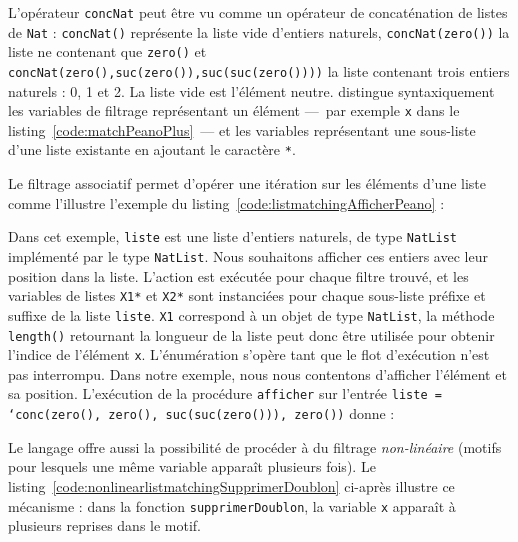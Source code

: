 

L'opérateur \texttt{concNat} peut être vu comme un opérateur de concaténation
de listes de \texttt{Nat} : \texttt{concNat()} représente la liste vide
d'entiers naturels, \texttt{concNat(zero())} la liste ne contenant que
\texttt{zero()} et \texttt{concNat(zero(),suc(zero()),suc(suc(zero())))} la
liste contenant trois entiers naturels : 0, 1 et 2. La liste vide est
l'élément neutre.
{\tom} distingue syntaxiquement les variables de filtrage représentant un
élément ---~par exemple \texttt{x} dans le
listing~\ref{code:matchPeanoPlus}~--- et les variables représentant une
sous-liste d'une liste existante en ajoutant le caractère \texttt{*}.

Le filtrage associatif permet d'opérer une itération sur les éléments d'une
liste comme l'illustre l'exemple du
listing~\ref{code:listmatchingAfficherPeano} :



Dans cet exemple, \texttt{liste} est une liste d'entiers naturels, de type
\texttt{NatList} implémenté par le type {\java} \texttt{NatList}.  Nous
souhaitons afficher ces entiers avec leur position dans la liste. L'action est
exécutée pour chaque filtre trouvé, et les variables de listes \texttt{X1*} et
\texttt{X2*} sont instanciées pour chaque sous-liste préfixe et suffixe de la
liste \texttt{liste}. \texttt{X1} correspond à un objet {\java} de type
\texttt{NatList}, la méthode \texttt{length()} retournant la longueur de la
liste peut donc être utilisée pour obtenir l'indice de l'élément \texttt{x}.
L'énumération s'opère tant que le flot d'exécution n'est pas interrompu. Dans
notre exemple, nous nous contentons d'afficher l'élément et sa position.
L'exécution de la procédure \texttt{afficher} sur l'entrée \texttt{liste =
`conc(zero(), zero(), suc(suc(zero())), zero())} donne :



Le langage {\tom} offre aussi la possibilité de procéder à du filtrage
\emph{non-linéaire} (motifs pour lesquels une même variable apparaît plusieurs
fois). Le listing~\ref{code:nonlinearlistmatchingSupprimerDoublon} ci-après
illustre ce mécanisme : dans la fonction \texttt{supprimerDoublon}, la variable
\texttt{x} apparaît à plusieurs reprises dans le motif.



